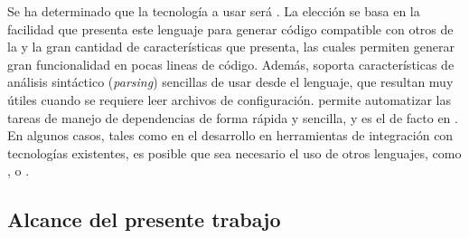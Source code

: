 Se ha determinado que la tecnología a usar será \scala. La elección se basa en la
facilidad que presenta este lenguaje para generar código compatible con otros de la
\jvm y la gran cantidad de características que presenta, las cuales permiten generar
gran funcionalidad en pocas lineas de código. Además, \scala soporta características
de análisis sintáctico (\emph{parsing}) sencillas de usar desde el lenguaje, que
resultan muy útiles cuando se requiere leer archivos de configuración. \sbt permite
automatizar las tareas de manejo de dependencias de forma rápida y sencilla, y es el
\depmgr de facto en \scala.\\
En algunos casos, tales como en el desarrollo en herramientas de integración con
tecnologías existentes, es posible que sea necesario el uso de otros lenguajes,
como \java, \clojure o \groovy.



\subsection{Alcance del presente trabajo}
\label{subsec:solution:todo}

